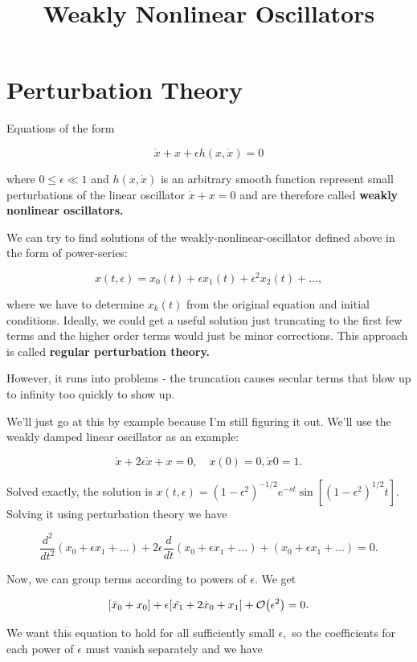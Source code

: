 \documentclass{article}
\title{Weakly Nonlinear Oscillators}
\begin{document}
\section{Perturbation Theory}

\begin{definition}
Equations of the form

\[ \dot{x} + x + \epsilon h(x, \dot{x}) = 0 \tag{a} \]

where $0 \leq \epsilon \ll 1$ and $h(x, \dot{x})$ is an arbitrary \@{smooth} \@{function} represent small \@{perturbations} of the \@{linear} \@{oscillator} $\dot{x} + x = 0$ and are therefore called \textbf{weakly nonlinear oscillators.}
\end{definition}

We can try to find solutions of the \@{weakly-nonlinear-oscillator} defined above in the form of \@{power-series}:

\[ x(t, \epsilon) = x_0(t) + \epsilon x_1(t) + \epsilon^2 x_2 (t) + \dots, \tag{b} \]

where we have to determine $x_k(t)$ from the original equation and initial conditions. Ideally, we could get a useful solution just truncating to the first few terms and the higher order terms would just be minor corrections. This approach is called \textbf{regular perturbation theory.}

However, it runs into problems - the truncation causes secular terms that blow up to infinity too quickly to show up.

We'll just go at this by example because I'm still figuring it out. We'll use the weakly damped linear oscillator as an example:

\[ \dot{x} + 2 \epsilon \dot{x} + x = 0, \quad x(0) = 0, \dot{x} 0 = 1. \tag{c} \]

Solved exactly, the solution is $x(t, \epsilon) = (1 - \epsilon^2)^{-1/2}e^{-st}\sin{[(1-\epsilon^2)^{1/2}t]}. \tag{s}$ Solving it using perturbation theory we have

\[ \frac{d^2}{dt^2} (x_0 + \epsilon x_1 + \dots) + 2 \epsilon \frac{d}{dt} (x_0 + \epsilon x_1 + \dots) + (x_0  + \epsilon x_1 + \dots) = 0. \]

Now, we can group terms according to powers of $\epsilon.$ We get

\[ [\ddot{x}_0 + x_0] + \epsilon[\ddot{x_1} + 2 \dot{x}_0 + x_1] + \mathcal{O}\!\left(\epsilon^2\right) = 0. \]

We want this equation to hold for all sufficiently small $\epsilon,$ so the coefficients for each power of $\epsilon$ must vanish separately and we have
\end{document}
